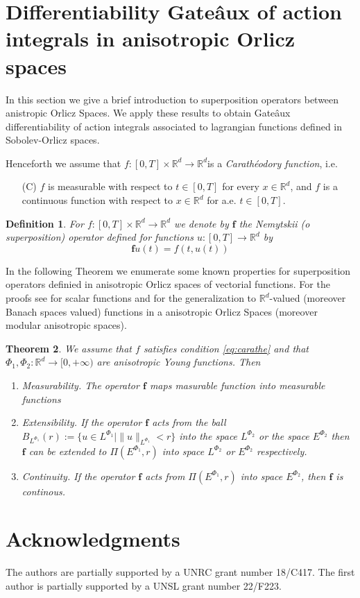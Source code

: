 \documentclass[twoside]{article}
\makeatletter
\newtheorem{thm}{Theorem}[section]
\newtheorem{defi}[thm]{Definition}
\theoremstyle{remark}
\def\namedlabel#1#2{\begingroup
    #2%
    \def\@currentlabel{#2}%
    \phantomsection\label{#1}\endgroup
}
\renewcommand{\b}[1]{\boldsymbol{#1}}
\newcommand{\rr}{\mathbb{R}}
\makeatother
\begin{document}
\section{Differentiability Gate\^aux of action integrals in anisotropic Orlicz spaces}
In this section we give a brief introduction to superposition operators between anistropic Orlicz Spaces.  We apply these results to obtain Gate\^aux differentiability of                                                                                action integrals associated to lagrangian functions defined in Sobolev-Orlicz spaces.

Henceforth we assume that  $f:[0,T]\times \rr^d\to\rr^d$is a \emph{Carath\'eodory function}, i.e.

\begin{enumerate}
 \item[\namedlabel{eq:carathe}{(C)}] $f$ is measurable with respect to $t\in [0,T]$ for every  $x\in\rr^d$, and $f$ is a continuous function with  respect to  $x\in\rr^d$ for a.e. $t \in [0,T]$.
\end{enumerate}




\begin{defi}
 For $f:[0,T]\times \rr^d\to\rr^d$  we denote by $\b{f}$ the Nemytskii (o superposition) operator defined for functions $u:[0,T]\to\rr^d$ by
\[\b{f}u(t)=f(t,u(t))\]
\end{defi}

In the following Theorem we enumerate  some known properties for superposition operators definied in anisotropic Orlicz spaces of vectorial functions.   For the proofs see \cite{krasnosel2011integral} for scalar functions  and
\cite{zbMATH04038592,zbMATH03983966,zbMATH03942215} for the generalization to  $\mathbb{R}^d$-valued  (moreover Banach spaces valued)  functions in a anisotropic Orlicz Spaces (moreover modular anisotropic spaces).

\begin{thm} We assume that $f$ satisfies condition \eqref{eq:carathe} and that $\Phi_1,\Phi_2:\rr^d\to [0,+\infty)$ are anisotropic Young functions. Then
\begin{enumerate}
 \item\label{it:measure}\emph{Measurability.}  The operator $\b{f}$ maps  masurable function into measurable functions
 \item\label{it:exten}\emph{Extensibility.}  If the operator $\b{f}$ acts from the ball $B_{L^{\Phi_1}}(r):=\{ u\in L^{\Phi_1}| \|u\|_{L^{\Phi_1}}<r\}$ into the space $L^{\Phi_2}$ or the space $E^{\Phi_2}$ then $\b{f}$ can be extended  to $\Pi(E^{\Phi_1},r)$ into space $L^{\Phi_2}$ or  $E^{\Phi_2}$ respectively.
 \item\label{it:exten}\emph{Continuity.} If the operator $\b{f}$ acts from $\Pi(E^{\Phi_1},r)$ into space $E^{\Phi_2}$, then $\b{f}$ is continous.
\end{enumerate}




\end{thm}




\section*{Acknowledgments}
The authors are partially supported by a UNRC grant number 18/C417. The first author is  partially supported by a  UNSL grant number 22/F223. 




 
 
\end{document}
